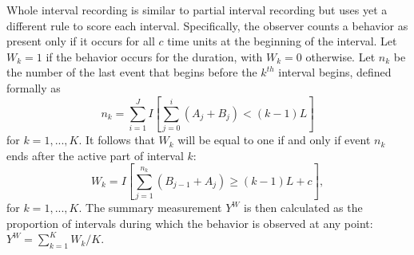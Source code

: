\documentclass{article}\usepackage[]{graphicx}\usepackage[]{color}
\begin{document}
Whole interval recording is similar to partial interval recording but uses yet a different rule to score each interval. Specifically, the observer counts a behavior as present only if it occurs for all $c$ time units at the beginning of the interval. Let $W_k = 1$ if the behavior occurs for the duration, with $W_k = 0$ otherwise. Let $n_k$ be the number of the last event that begins before the $k^{th}$ interval begins, defined formally as \[
n_k = \sum_{i=1}^J I\left[\sum_{j=0}^i \left(A_j + B_j\right) < (k - 1) L \right] \]
for $k = 1,...,K$. It follows that $W_k$ will be equal to one if and only if event $n_k$ ends after the active part of interval $k$: \[
W_k = I \left[\sum_{j=1}^{n_k} \left(B_{j-1} + A_j\right) \geq (k - 1) L + c \right], \]
for $k=1,...,K$. The summary measurement $Y^W$ is then calculated as the proportion of intervals during which the behavior is observed at any point: $\displaystyle{Y^W = \sum_{k=1}^K W_k / K}$.
\end{document}
